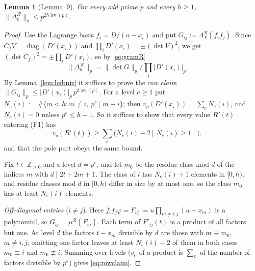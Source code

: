 \documentclass[11pt]{amsart}
\newtheorem{lemma}[theorem]{Lemma}
\theoremstyle{definition}
\theoremstyle{remark}
\numberwithin{equation}{section}
\newcommand{\ZZ}{\mathbb{Z}}
\newcommand{\cR}{\mathcal{R}}
\newcommand{\ind}[1]{[\,#1\,]}
\newcommand{\lev}{\operatorname{lev}}
\begin{document}
\begin{lemma}[Lemma~9]\label{lem:nine}
For every odd prime $p$ and every $h\ge1$, $\|\Delta^{\cR}_h\|_p\le p^{2h\lev(p)}$.
\end{lemma}

\begin{proof}
Use the Lagrange basis $f_i=D/(u-x_i)$ and put $G_{ij}:=\Lambda^{\cR}_X(f_if_j)$. Since $C_fV=\operatorname{diag}(D'(x_i))$
and $\prod_iD'(x_i)=\pm(\det V)^2$, we get $(\det C_f)^2=\pm\prod_iD'(x_i)$, so by \eqref{eq:gramR}
\[
  \|\Delta^{\cR}_h\|_p=\|\det G\|_p\Big/\prod_i|D'(x_i)|_p .
\]
By Lemma~\ref{lem:leibniz} it suffices to prove the \emph{row claim} $\|G_{ij}\|_p\le|D'(x_i)|_p\,p^{2\lev(p)}$. For a
level $e\ge1$ put $N_e(i):=\#\{m<h:m\ne i,\ p^e\mid m-i\}$; then $v_p(D'(x_i))=\sum_eN_e(i)$, and $N_e(i)=0$ unless
$p^e\le h-1$. So it suffices to show that every value $R'(t)$ entering (F1) has
\begin{equation}\label{eq:rowclaim}
  v_p(R'(t))\ge\sum_e\bigl(N_e(i)-2\ind{N_e(i)\ge1}\bigr),
\end{equation}
and that the pole part obeys the same bound.

Fix $t\in\ZZ_{\ge0}$ and a level $d=p^e$, and let $m_0$ be the residue class mod $d$ of the indices $m$ with
$d\mid2t+2m+1$. The class of $i$ has $N_e(i)+1$ elements in $[0,h)$, and residue classes mod $d$ in $[0,h)$ differ in
size by at most one, so the class $m_0$ has at least $N_e(i)$ elements.

\emph{Off-diagonal entries} ($i\ne j$). Here $f_if_j\varphi=F_{ij}:=u\prod_{m\ne i,j}(u-x_m)$ is a polynomial, so
$G_{ij}=\mu^{\cR}(F_{ij})$. Each term of $F'_{ij}(t)$ is a product of all factors but one. At level $d$ the factors
$t-x_m$ divisible by $d$ are those with $m\equiv m_0$, $m\ne i,j$; omitting one factor leaves at least
$N_e(i)-2$ of them in both cases $m_0\equiv i$ and $m_0\not\equiv i$. Summing over levels ($v_p$ of a product is
$\sum_e$ of the number of factors divisible by $p^e$) gives \eqref{eq:rowclaim}.


\end{proof}
\end{document}
